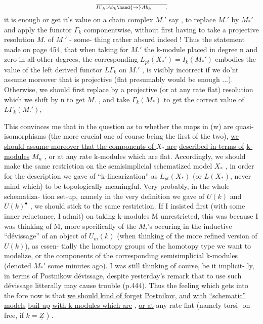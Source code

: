 
\[ \over{I}{\Gamma}_k : Ab_k \hand{\to} Ab_k \qquad , \]
it is enough\hand{,} or get it's value on a chain complex  $M.'$ say ,
to replace  $M.'$ by $M_*'$ and apply the functor $\Gamma_k$ componentwise,
without first having to take a projective resolution $M.$ of $M.'$ - some-%
thing rather absurd indeed ! Thus the statement made on page 454, that
when taking for $M.'$ the k-module \hand{$\pi$} placed in degree n and zero in all
other degrees, the corresponding $L_{pt}(X_*') = I_k(M_*')$ embodies the
value of the left derived functor $L\Gamma_k$ on $M.'$ , is visibly incorrect if
we do'nt assume moreover that \hand{$\pi$} is projective (flat presumably would be
enough ...). Otherwise, we should first replace \hand{$\pi$} by a projective
(or at any rate flat) resolution\hand{,} which we shift by n to get $M.$ , and 
take $\Gamma_k(M_*)$ to get the correct value of $L\Gamma_k(M.')$,

This convinces me that in the question as to whether the maps in (w)
are quasi-isomorphisms (the more crucial one of course being the first
of the two), \uline{we should assume moreover that the components of $X_*$ are}
\uline{described in terms of}  \uline{k-modules} $M_n$ , or at any rate k-modules
which are flat. Accordingly, we should make the same restriction on
the semisimplicial schematized model $X_*$ , in order for the description
we gave of ``k-linearization'' as $L_{pt}(X_*)$ (or $L(X_*)$, never mind which)
to be topologically meaningful. Very probably, in the whole schematiza-%
tion set-up, namely in the very definition we gave of $U(k)$ and $U(k)^\bullet$ ,
we should stick to the same restriction. If  I insisted
first (with some inner reluctance, I admit) on taking k-modules M
unrestricted, this was because I was thinking of M, more specifically
of the $M_i$'s occuring in the inductive ``dévissage'' of an object of
$U_m(k)$ (when thinking of the more refined version of $U(k)$), as essen-%
tially the homotopy groups of the homotopy type we want to modelize,
or  the components of the corresponding semisimplicial k-modules (denoted
$M_*'$ some minutes ago). I was still thinking of course, be it implicit-%
ly, in terms of Postnikow dévissage, despite yesterday's remark that
to use such dévissage litterally may cause trouble (p.444). Thus the
feeling which gets into the fore now is that \uline{we should kind of forget}
\uline{Postnikov}, \uline{and}   \uline{with} \uline{} \uline{``schematic''} \uline{models} \uline{buil up}
\uline{with k-modules which are} , \uline{or at} any rate flat (namely torsi-%
on free, if $k=\underline{Z}$ ) .

